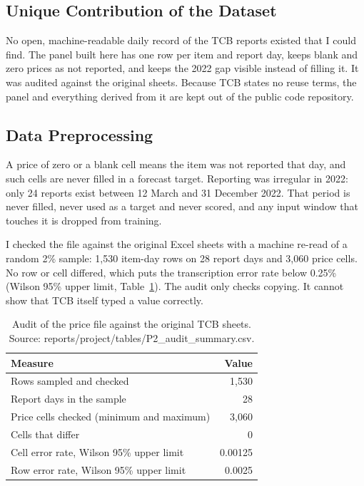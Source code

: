 \documentclass[12pt]{report}
\begin{document}
\subsection{Unique Contribution of the Dataset}
No open, machine-readable daily record of the TCB reports existed that I could find. The panel built here has one row per item and report day, keeps blank and zero prices as not reported, and keeps the 2022 gap visible instead of filling it. It was audited against the original sheets. Because TCB states no reuse terms, the panel and everything derived from it are kept out of the public code repository.

\subsection{Data Preprocessing}
A price of zero or a blank cell means the item was not reported that day, and such cells are never filled in a forecast target. Reporting was irregular in 2022: only 24 reports exist between 12 March and 31 December 2022. That period is never filled, never used as a target and never scored, and any input window that touches it is dropped from training.

I checked the file against the original Excel sheets with a machine re-read of a random 2\% sample: 1,530 item-day rows on 28 report days and 3,060 price cells. No row or cell differed, which puts the transcription error rate below 0.25\% (Wilson 95\% upper limit, Table~\ref{tab:audit}). The audit only checks copying. It cannot show that TCB itself typed a value correctly.

\begin{table}[H]\centering\small
\caption{Audit of the price file against the original TCB sheets. Source: reports/project/tables/P2\_audit\_summary.csv.}\label{tab:audit}
\begin{tabular}{|l|r|}
\hline
\textbf{Measure} & \textbf{Value} \\
\hline
Rows sampled and checked & 1,530 \\
\hline
Report days in the sample & 28 \\
\hline
Price cells checked (minimum and maximum) & 3,060 \\
\hline
Cells that differ & 0 \\
\hline
Cell error rate, Wilson 95\% upper limit & 0.00125 \\
\hline
Row error rate, Wilson 95\% upper limit & 0.0025 \\
\hline
\end{tabular}
\end{table}
\end{document}

